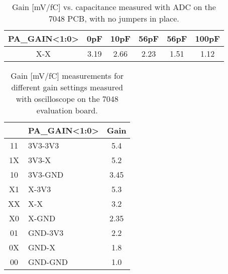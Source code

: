 \documentclass[../main/thesis.tex]{subfiles}
\begin{document}
\begin{table}[h!]
	\begin{center}
		\caption{Gain [mV/fC] vs. capacitance measured with ADC on the 7048 PCB, with no jumpers in place.}
		\label{tab-gain-adc-7048}
		\begin{tabular}{cccccc}\toprule
			\textbf{PA\_GAIN<1:0>} & \textbf{0pF}  & \textbf{10pF} & \textbf{56pF} & \textbf{56pF} & \textbf{100pF} \\ \midrule
			X-X     & 3.19 & 2.66  & 2.23  & 1.51 & 1.12   \\ \bottomrule
		\end{tabular}
	\end{center}
\end{table}

\begin{table}[h!]	%
	\begin{center}
		\caption{Gain [mV/fC] measurements for different gain settings measured with oscilloscope on the 7048 evaluation board.}
		\label{tab-gains-7048}
		\begin{tabular}{clc}\toprule
			&\textbf{PA\_GAIN<1:0>} & \textbf{Gain}   \\ \midrule
			11&3V3-3V3 & 5.4  \\
			1X&3V3-X & 5.2  \\
			10&3V3-GND & 3.45 \\
			X1&X-3V3 & 5.3  \\
			XX&X-X & 3.2  \\
			X0&X-GND & 2.35 \\
			01&GND-3V3 & 2.2  \\
			0X&GND-X& 1.8  \\
			00&GND-GND & 1.0   \\ \bottomrule
		\end{tabular}
	\end{center}
\end{table}
\end{document}
